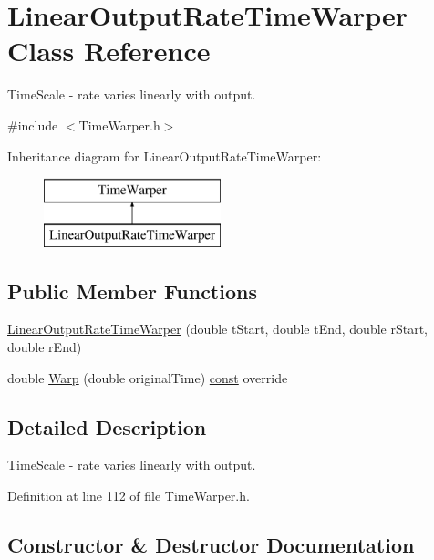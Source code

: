 \hypertarget{class_linear_output_rate_time_warper}{}\section{Linear\+Output\+Rate\+Time\+Warper Class Reference}
\label{class_linear_output_rate_time_warper}


Time\+Scale -\/ rate varies linearly with output.  




{\ttfamily \#include $<$Time\+Warper.\+h$>$}

Inheritance diagram for Linear\+Output\+Rate\+Time\+Warper\+:\begin{figure}[H]
\begin{center}
\leavevmode
\includegraphics[height=2.000000cm]{class_linear_output_rate_time_warper}
\end{center}
\end{figure}
\subsection*{Public Member Functions}
\begin{DoxyCompactItemize}
\item 
\hyperlink{class_linear_output_rate_time_warper_a4498674e5f1bf0f198d41f983ff6cd66}{Linear\+Output\+Rate\+Time\+Warper} (double t\+Start, double t\+End, double r\+Start, double r\+End)
\item 
double \hyperlink{class_linear_output_rate_time_warper_a5b0926127b90c5649ec201d5c0d29036}{Warp} (double original\+Time) \hyperlink{getopt1_8c_a2c212835823e3c54a8ab6d95c652660e}{const}  override
\end{DoxyCompactItemize}


\subsection{Detailed Description}
Time\+Scale -\/ rate varies linearly with output. 

Definition at line 112 of file Time\+Warper.\+h.



\subsection{Constructor \& Destructor Documentation}
